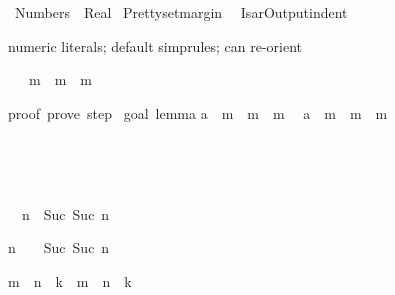 %
\begin{isabellebody}%
\def\isabellecontext{Numbers}%
\isanewline
{}\ Numbers\ {\isacharequal}\ Real{\isacharcolon}\isanewline
\isanewline
{}\ {\isachardoublequote}Pretty{\isachardot}setmargin\ {}{}{\isachardoublequote}\isanewline
{}\ {\isachardoublequote}IsarOutput{\isachardot}indent\ {\isacharcolon}{\isacharequal}\ {}{\isachardoublequote}%
\begin{isamarkuptext}%
numeric literals; default simprules; can re-orient%
\end{isamarkuptext}%
\ {\isachardoublequote}{\isacharhash}{}\ {\isacharasterisk}\ m\ {\isacharequal}\ m\ {\isacharplus}\ m{\isachardoublequote}\isanewline
{}%
\begin{isamarkuptext}%
proof\ {\isacharparenleft}prove{\isacharparenright}{\isacharcolon}\ step\ {}\isanewline
\isanewline
goal\ {\isacharparenleft}lemma{\isacharparenright}{\isacharcolon}\isanewline
{\isacharparenleft}{\isacharhash}{}{\isasymColon}{\isacharprime}a{\isacharparenright}\ {\isacharasterisk}\ m\ {\isacharequal}\ m\ {\isacharplus}\ m\isanewline
\ {}{\isachardot}\ {\isacharparenleft}{\isacharhash}{}{\isasymColon}{\isacharprime}a{\isacharparenright}\ {\isacharasterisk}\ m\ {\isacharequal}\ m\ {\isacharplus}\ m


\begin{isabelle}%
{\isacharhash}{}\ {\isacharequal}\ {}%
\end{isabelle}

\begin{isabelle}%
{\isacharhash}{}\ {\isacharequal}\ {}%
\end{isabelle}

\begin{isabelle}%
{\isacharhash}{}\ {\isacharplus}\ n\ {\isacharequal}\ Suc\ {\isacharparenleft}Suc\ n{\isacharparenright}%
\end{isabelle}

\begin{isabelle}%
n\ {\isacharplus}\ {\isacharhash}{}\ {\isacharequal}\ Suc\ {\isacharparenleft}Suc\ n{\isacharparenright}%
\end{isabelle}

\begin{isabelle}%
m\ {\isacharplus}\ n\ {\isacharplus}\ k\ {\isacharequal}\ m\ {\isacharplus}\ {\isacharparenleft}n\ {\isacharplus}\ k{\isacharparenright}%
\end{isabelle}


\end{isamarkuptext}
\end{isabellebody}
